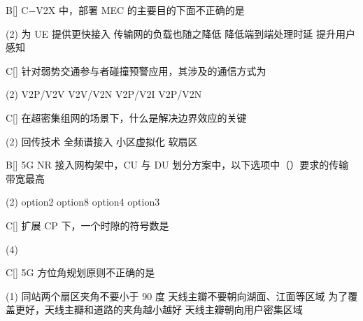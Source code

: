 \begin{choice}{B}[]
    C−V2X 中，部署 MEC 的主要目的下面不正确的是
    \begin{tasks}(2)
        \task 为 UE 提供更快接入
        \task 传输网的负载也随之降低
        \task 降低端到端处理时延
        \task 提升用户感知
    \end{tasks}
\end{choice}


\begin{choice}{C}[]
    针对弱势交通参与者碰撞预警应用，其涉及的通信方式为
    \begin{tasks}(2)
        \task V2P/V2V
        \task V2V/V2N
        \task V2P/V2I
        \task V2P/V2N
    \end{tasks}
\end{choice}



\begin{choice}{C}[]
    在超密集组网的场景下，什么是解决边界效应的关键
    \begin{tasks}(2)
        \task 回传技术
        \task 全频谱接入
        \task 小区虚拟化
        \task 软扇区
    \end{tasks}
\end{choice}



\begin{choice}{B}[]
    5G NR 接入网构架中，CU 与 DU 划分方案中，以下选项中（\quad）要求的传输带宽最高
    \begin{tasks}(2)
        \task option2
        \task option8
        \task option4
        \task option3
    \end{tasks}
\end{choice}




\begin{choice}{C}[]
    扩展 CP 下，一个时隙的符号数是
    \begin{tasks}(4)
    \end{tasks}
\end{choice}


\begin{choice}{C}[]
    5G 方位角规划原则不正确的是
    \begin{tasks}(1)
        \task 同站两个扇区夹角不要小于 90 度
        \task 天线主瓣不要朝向湖面、江面等区域
        \task 为了覆盖更好，天线主瓣和道路的夹角越小越好
        \task 天线主瓣朝向用户密集区域
    \end{tasks}
\end{choice}


